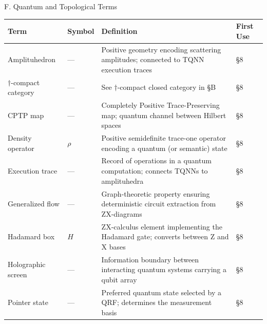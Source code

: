 \documentclass[
  ignorenonframetext,
]{beamer}
\newcounter{none} %
\begin{document}
\begin{frame}{F. Quantum and Topological Terms}
\protect{}\label{f.-quantum-and-topological-terms}
{\def\LTcaptype{none} %
\begin{longtable}[]{@{}
  >{\raggedright\arraybackslash}p{}
  >{\centering\arraybackslash}p{}
  >{\raggedright\arraybackslash}p{}
  >{\centering\arraybackslash}p{}@{}}
\toprule\noalign{}
\begin{minipage}[b]{\linewidth}\raggedright
Term
\end{minipage} & \begin{minipage}[b]{\linewidth}\centering
Symbol
\end{minipage} & \begin{minipage}[b]{\linewidth}\raggedright
Definition
\end{minipage} & \begin{minipage}[b]{\linewidth}\centering
First Use
\end{minipage} \\
\midrule\noalign{}
\endhead
Amplituhedron & --- & Positive geometry encoding scattering amplitudes;
connected to TQNN execution traces & §8 \\
\(\dagger\)-compact category & --- & See \(\dagger\)-compact closed
category in §B & §8 \\
CPTP map & --- & Completely Positive Trace-Preserving map; quantum
channel between Hilbert spaces & §8 \\
Density operator & \(\rho\) & Positive semidefinite trace-one operator
encoding a quantum (or semantic) state & §8 \\
Execution trace & --- & Record of operations in a quantum computation;
connects TQNNs to amplituhedra & §8 \\
Generalized flow & --- & Graph-theoretic property ensuring deterministic
circuit extraction from ZX-diagrams & §8 \\
Hadamard box & \(H\) & ZX-calculus element implementing the Hadamard
gate; converts between Z and X bases & §8 \\
Holographic screen & --- & Information boundary between interacting
quantum systems carrying a qubit array & §8 \\
Pointer state & --- & Preferred quantum state selected by a QRF;
determines the measurement basis & §8 \\

\end{longtable}}
\end{frame}
\end{document}
